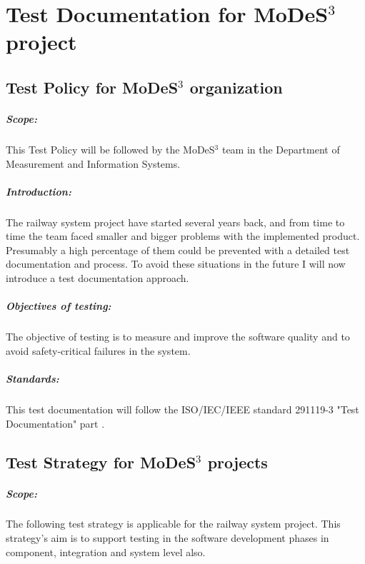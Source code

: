 \chapter{Test Documentation for MoDeS$^3$ project}\label{TestDoc:MODES}

\section{Test Policy for MoDeS$^3$ organization}
\paragraph{Scope:} This Test Policy will be followed by the MoDeS$^3$ team in the Department of Measurement and Information Systems.
\paragraph{Introduction:} The railway system project have started several years back, and from time to time the team faced smaller and bigger problems with the implemented product. Presumably a high percentage of them could be prevented with a detailed test documentation and process. To avoid these situations in the future I will now introduce a test documentation approach.
\paragraph{Objectives of testing:} The objective of testing is to measure and improve the software quality and to avoid safety-critical failures in the system.
\paragraph{Standards:} This test documentation will follow the ISO/IEC/IEEE standard 291119-3 "Test Documentation" part \cite{IEEE13}.

\section{Test Strategy for MoDeS$^3$ projects}
\paragraph{Scope:} The following test strategy is applicable for the railway system project. This strategy's aim is to support testing in the software development phases in component, integration and system level also.
